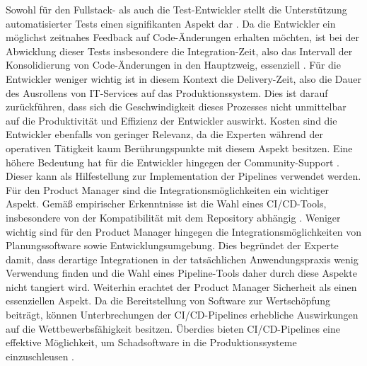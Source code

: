 Sowohl für den Fullstack- als auch die Test-Entwickler stellt die Unterstützung automatisierter Tests einen signifikanten Aspekt dar \cite[Z. 5 ff.]{BackendTestDeveloperSAPDTSIntegration.}. Da die Entwickler ein möglichst zeitnahes Feedback auf Code-Änderungen erhalten möchten, ist bei der Abwicklung dieser Tests insbesondere die Integration-Zeit, also das Intervall der Konsolidierung von Code-Änderungen in den Hauptzweig, essenziell \cite[Z. 23 ff.]{TestDeveloperSAPHyperspaceAdoption&Onboarding.b}. Für die Entwickler weniger wichtig ist in diesem Kontext die Delivery-Zeit, also die Dauer des Ausrollens von IT-Services auf das Produktionssystem. Dies ist darauf zurückführen, dass sich die Geschwindigkeit dieses Prozesses nicht unmittelbar auf die Produktivität  und Effizienz der Entwickler auswirkt. Kosten sind die Entwickler ebenfalls von geringer Relevanz, da die Experten während der operativen Tätigkeit kaum Berührungspunkte mit diesem Aspekt besitzen. Eine höhere Bedeutung hat für die Entwickler hingegen der Community-Support \cite[Z. 25 ff.]{FullStackEntwicklerSAPDTSIntegration.}. Dieser kann als Hilfestellung zur Implementation der Pipelines verwendet werden. Für den Product Manager sind die Integrationsmöglichkeiten ein wichtiger Aspekt. Gemäß empirischer Erkenntnisse ist die Wahl eines CI/CD-Tools, insbesondere von der Kompatibilität mit dem Repository abhängig \cite[Z. 5 ff.]{exp8}. Weniger wichtig sind für den Product Manager hingegen die Integrationsmöglichkeiten von Planungssoftware sowie Entwicklungsumgebung. Dies begründet der Experte damit, dass derartige Integrationen in der tatsächlichen Anwendungspraxis wenig Verwendung finden und die Wahl eines Pipeline-Tools daher durch diese Aspekte nicht tangiert wird. Weiterhin erachtet der Product Manager Sicherheit als einen essenziellen Aspekt. Da die Bereitstellung von Software zur Wertschöpfung beiträgt, können Unterbrechungen der CI/CD-Pipelines erhebliche Auswirkungen auf die Wettbewerbsfähigkeit besitzen. Überdies bieten CI/CD-Pipelines eine effektive Möglichkeit, um Schadsoftware in die Produktionssysteme einzuschleusen \cite[Z. 5 ff.]{exp8}. 

